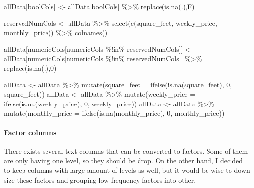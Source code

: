 \documentclass[
]{article}
\newenvironment{Shaded}{\begin{snugshade}}{\end{snugshade}}
\newcommand{\AttributeTok}[1]{\textcolor[rgb]{0.77,0.63,0.00}{#1}}
\newcommand{\DecValTok}[1]{\textcolor[rgb]{0.00,0.00,0.81}{#1}}
\newcommand{\FunctionTok}[1]{\textcolor[rgb]{0.00,0.00,0.00}{#1}}
\newcommand{\NormalTok}[1]{#1}
\newcommand{\OtherTok}[1]{\textcolor[rgb]{0.56,0.35,0.01}{#1}}
\newcommand{\SpecialCharTok}[1]{\textcolor[rgb]{0.00,0.00,0.00}{#1}}
\begin{document}
\begin{Shaded}
\begin{Highlighting}[]
\NormalTok{allData[boolCols] }\OtherTok{\textless{}{-}}\NormalTok{ allData[boolCols] }\SpecialCharTok{\%\textgreater{}\%} \FunctionTok{replace}\NormalTok{(}\FunctionTok{is.na}\NormalTok{(.),F)}

\NormalTok{reservedNumCols }\OtherTok{\textless{}{-}}\NormalTok{ allData }\SpecialCharTok{\%\textgreater{}\%} \FunctionTok{select}\NormalTok{(}\FunctionTok{c}\NormalTok{(square\_feet, weekly\_price, monthly\_price)) }\SpecialCharTok{\%\textgreater{}\%} \FunctionTok{colnames}\NormalTok{()}

\NormalTok{allData[numericCols[numericCols }\SpecialCharTok{\%!in\%}\NormalTok{ reservedNumCols]] }\OtherTok{\textless{}{-}} 
\NormalTok{  allData[numericCols[numericCols }\SpecialCharTok{\%!in\%}\NormalTok{ reservedNumCols]] }\SpecialCharTok{\%\textgreater{}\%} \FunctionTok{replace}\NormalTok{(}\FunctionTok{is.na}\NormalTok{(.),}\DecValTok{0}\NormalTok{)}

\NormalTok{allData }\OtherTok{\textless{}{-}}\NormalTok{ allData }\SpecialCharTok{\%\textgreater{}\%} \FunctionTok{mutate}\NormalTok{(}\AttributeTok{square\_feet =} \FunctionTok{ifelse}\NormalTok{(}\FunctionTok{is.na}\NormalTok{(square\_feet), }\DecValTok{0}\NormalTok{, square\_feet))}
\NormalTok{allData }\OtherTok{\textless{}{-}}\NormalTok{ allData }\SpecialCharTok{\%\textgreater{}\%} \FunctionTok{mutate}\NormalTok{(}\AttributeTok{weekly\_price =} \FunctionTok{ifelse}\NormalTok{(}\FunctionTok{is.na}\NormalTok{(weekly\_price), }\DecValTok{0}\NormalTok{, weekly\_price))}
\NormalTok{allData }\OtherTok{\textless{}{-}}\NormalTok{ allData }\SpecialCharTok{\%\textgreater{}\%} \FunctionTok{mutate}\NormalTok{(}\AttributeTok{monthly\_price =} \FunctionTok{ifelse}\NormalTok{(}\FunctionTok{is.na}\NormalTok{(monthly\_price), }\DecValTok{0}\NormalTok{, monthly\_price))}
\end{Highlighting}
\end{Shaded}

\hypertarget{factor-columns}{%
\paragraph{Factor columns}\label{factor-columns}}

There exists several text columns that can be converted to factors. Some
of them are only having one level, so they should be drop. On the other
hand, I decided to keep columns with large amount of levels as well, but
it would be wise to down size these factors and grouping low frequency
factors into other.
\end{document}

